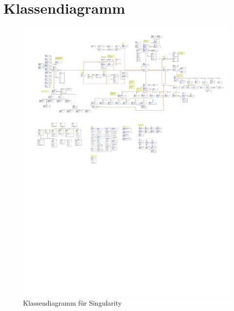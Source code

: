 \documentclass[12pt]{article}
\begin{document}
\section{Klassendiagramm}
\begin{figure}[h!]
	\centering
	\includegraphics[trim={0 13.5cm 0 0}, clip, width=\linewidth]{res/class.pdf}
	\caption{Klassendiagramm für Singularity}
\end{figure}
\end{document}
